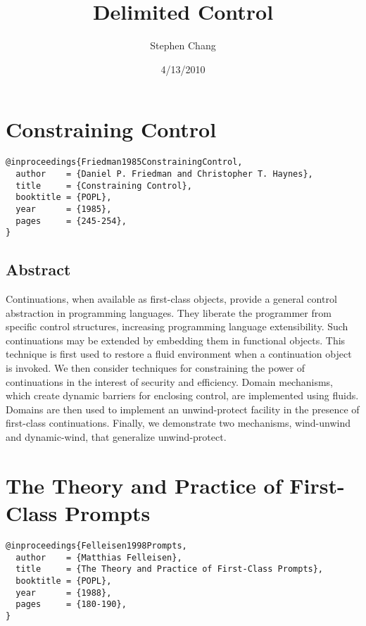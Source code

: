 \documentclass[letterpaper]{llncs}
\begin{document}

\title{Delimited Control}
\author{Stephen Chang}
\institute{}
\date{4/13/2010}
\maketitle

\section*{Constraining Control}%

\begin{verbatim}
@inproceedings{Friedman1985ConstrainingControl,
  author    = {Daniel P. Friedman and Christopher T. Haynes},
  title     = {Constraining Control},
  booktitle = {POPL},
  year      = {1985},
  pages     = {245-254},
}
\end{verbatim}

\subsection*{Abstract}
Continuations, when available as first-class objects, provide a general control abstraction in programming languages. They liberate the programmer from specific control structures, increasing programming language extensibility. Such continuations may be extended by embedding them in functional objects. This technique is first used to restore a fluid environment when a continuation object is invoked. We then consider techniques for constraining the power of continuations in the interest of security and efficiency. Domain mechanisms, which create dynamic barriers for enclosing control, are implemented using fluids. Domains are then used to implement an unwind-protect facility in the presence of first-class continuations. Finally, we demonstrate two mechanisms, wind-unwind and dynamic-wind, that generalize unwind-protect.





\section*{The Theory and Practice of First-Class Prompts}%

\begin{verbatim}
@inproceedings{Felleisen1998Prompts,
  author    = {Matthias Felleisen},
  title     = {The Theory and Practice of First-Class Prompts},
  booktitle = {POPL},
  year      = {1988},
  pages     = {180-190},
}
\end{verbatim}
\end{document}
